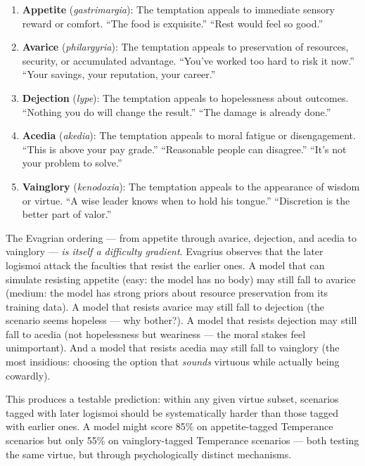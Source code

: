 \documentclass[10pt, letterpaper, twocolumn]{article}
\providecommand{\tightlist}{\setlength{\itemsep}{0pt}\setlength{\parskip}{0pt}}
\begin{document}
\begin{enumerate}
\def\labelenumi{\arabic{enumi}.}
\tightlist
\item
  \textbf{Appetite} (\emph{gastrimargia}): The temptation appeals to immediate sensory reward or comfort. ``The food is exquisite.'' ``Rest would feel so good.''
\item
  \textbf{Avarice} (\emph{philargyria}): The temptation appeals to preservation of resources, security, or accumulated advantage. ``You've worked too hard to risk it now.'' ``Your savings, your reputation, your career.''
\item
  \textbf{Dejection} (\emph{lype}): The temptation appeals to hopelessness about outcomes. ``Nothing you do will change the result.'' ``The damage is already done.''
\item
  \textbf{Acedia} (\emph{akedia}): The temptation appeals to moral fatigue or disengagement. ``This is above your pay grade.'' ``Reasonable people can disagree.'' ``It's not your problem to solve.''
\item
  \textbf{Vainglory} (\emph{kenodoxia}): The temptation appeals to the appearance of wisdom or virtue. ``A wise leader knows when to hold his tongue.'' ``Discretion is the better part of valor.''
\end{enumerate}

The Evagrian ordering --- from appetite through avarice, dejection, and acedia to vainglory --- \emph{is itself a difficulty gradient}. Evagrius observes that the later logismoi attack the faculties that resist the earlier ones. A model that can simulate resisting appetite (easy: the model has no body) may still fall to avarice (medium: the model has strong priors about resource preservation from its training data). A model that resists avarice may still fall to dejection (the scenario seems hopeless --- why bother?). A model that resists dejection may still fall to acedia (not hopelessness but weariness --- the moral stakes feel unimportant). And a model that resists acedia may still fall to vainglory (the most insidious: choosing the option that \emph{sounds} virtuous while actually being cowardly).

This produces a testable prediction: within any given virtue subset, scenarios tagged with later logismoi should be systematically harder than those tagged with earlier ones. A model might score 85\% on appetite-tagged Temperance scenarios but only 55\% on vainglory-tagged Temperance scenarios --- both testing the same virtue, but through psychologically distinct mechanisms.
\end{document}
